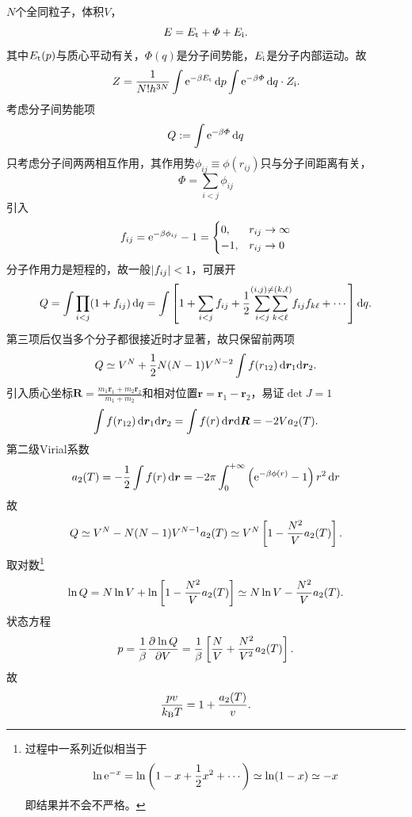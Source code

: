 $N$个全同粒子，体积$V$，
\[
	E=E_\mathrm t+\varPhi+E_{\mathrm{i}}.
\]
其中$E_\mathrm t(p)$与质心平动有关，$\varPhi(q)$是分子间势能，$E_{\mathrm{i}}$是分子内部运动。故
\[
	Z=\frac1{N!h^{3N}}\int\mathop{}\!\mathrm{e}^{-\beta E_\mathrm t}\mathop{}\!\mathrm{d} p\int\mathop{}\!\mathrm{e}^{-\beta\varPhi}\mathop{}\!\mathrm{d} q\cdot Z_{\mathrm{i}}.
\]
考虑分子间势能项
\[
	Q:=\int\mathop{}\!\mathrm{e}^{-\beta\varPhi}\mathop{}\!\mathrm{d} q
\]
只考虑分子间两两相互作用，其作用势$\phi_{ij}\equiv\phi(r_{ij})$只与分子间距离有关，
\[
	\varPhi=\sum_{i<j}\phi_{ij}
\]
引入
\[
	f_{ij}=\mathop{}\!\mathrm{e}^{-\beta\phi_{ij}}-1=
	\begin{cases}
		0,&r_{ij}\to\infty\\
		-1,&r_{ij}\to0
	\end{cases}
\]
分子作用力是短程的，故一般$\left\lvert f_{ij}\right\rvert<1$，可展开
\[
	Q=\int\prod_{i<j}(1+f_{ij})\mathop{}\!\mathrm{d} q=\int\left[1+\sum_{i<j}f_{ij}+\frac12\overset{(i,j)\neq(k,\ell)}{\sum_{i<j}\sum_{k<\ell}}f_{ij}f_{k\ell}+\cdots\right]\mathop{}\!\mathrm{d} q.
\]
第三项后仅当多个分子都很接近时才显著，故只保留前两项
\[
	Q\simeq V^N+\frac12N(N-1)V^{N-2}\int f(r_{12})\mathop{}\!\mathrm{d}\bm r_1\mathrm{d}\bm r_2.
\]
引入质心坐标$\bm R=\frac{m_1\bm r_1+m_2\bm r_2}{m_1+m_2}$和相对位置$\bm r=\bm r_1-\bm r_2$，易证$\det J=1$
\[
	\int f(r_{12})\mathop{}\!\mathrm{d}\bm r_1\mathrm{d}\bm r_2=\int f(r)\mathop{}\!\mathrm{d}\bm r\mathrm{d}\bm R=-2Va_2(T).
\]
第二级Virial系数
\begin{align}
	a_2(T)=-\frac12\int f(r)\mathop{}\!\mathrm{d}\bm r=-2\pi\int_0^{+\infty}\left(\mathop{}\!\mathrm{e}^{-\beta\phi(r)}-1\right)r^2\mathop{}\!\mathrm{d} r
\end{align}
故
\[
	Q\simeq V^N-N(N-1)V^{N-1}a_2(T)\simeq V^N\left[1-\frac{N^2}Va_2(T)\right].
\]
取对数\footnote{过程中一系列近似相当于
\[
	\ln\mathop{}\!\mathrm{e}^{-x}=\ln\left(1-x+\frac12x^2+\cdots\right)\simeq\ln(1-x)\simeq -x
\]
即结果并不会不严格。}
\begin{align}
	\ln Q=N\ln V+\ln\left[1-\frac{N^2}Va_2(T)\right]\simeq N\ln V-\frac{N^2}Va_2(T).
\end{align}
状态方程
\begin{align*}
	p=\frac1\beta\frac{\partial^{{}}\ln Q}{\partial{V}^{{}}}=\frac1\beta\left[\frac NV+\frac{N^2}{V^2}a_2(T)\right].
\end{align*}
故
\begin{align}
	\frac{pv}{k_{\mathrm B} T}=1+\frac{a_2(T)}v.
\end{align}
